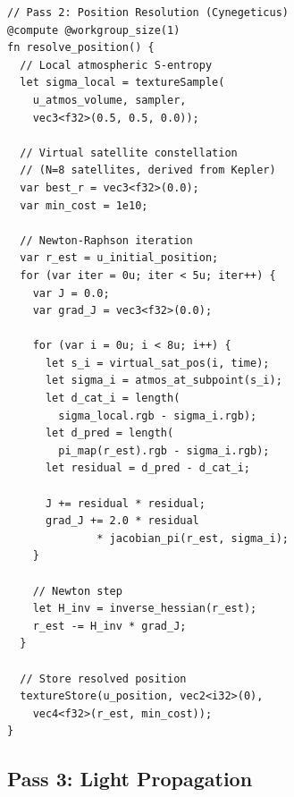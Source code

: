 \documentclass[10pt,twocolumn]{article}
\theoremstyle{definition}
\theoremstyle{remark}
\begin{document}
\begin{lstlisting}[style=wgsl,caption={Pass 2: Categorical
  triangulation for position (compute shader).},
  label={lst:pass2}]
// Pass 2: Position Resolution (Cynegeticus)
@compute @workgroup_size(1)
fn resolve_position() {
  // Local atmospheric S-entropy
  let sigma_local = textureSample(
    u_atmos_volume, sampler,
    vec3<f32>(0.5, 0.5, 0.0));

  // Virtual satellite constellation
  // (N=8 satellites, derived from Kepler)
  var best_r = vec3<f32>(0.0);
  var min_cost = 1e10;

  // Newton-Raphson iteration
  var r_est = u_initial_position;
  for (var iter = 0u; iter < 5u; iter++) {
    var J = 0.0;
    var grad_J = vec3<f32>(0.0);

    for (var i = 0u; i < 8u; i++) {
      let s_i = virtual_sat_pos(i, time);
      let sigma_i = atmos_at_subpoint(s_i);
      let d_cat_i = length(
        sigma_local.rgb - sigma_i.rgb);
      let d_pred = length(
        pi_map(r_est).rgb - sigma_i.rgb);
      let residual = d_pred - d_cat_i;

      J += residual * residual;
      grad_J += 2.0 * residual
              * jacobian_pi(r_est, sigma_i);
    }

    // Newton step
    let H_inv = inverse_hessian(r_est);
    r_est -= H_inv * grad_J;
  }

  // Store resolved position
  textureStore(u_position, vec2<i32>(0),
    vec4<f32>(r_est, min_cost));
}
\end{lstlisting}

\subsection{Pass 3: Light Propagation}\label{sec:pass3}
\end{document}
